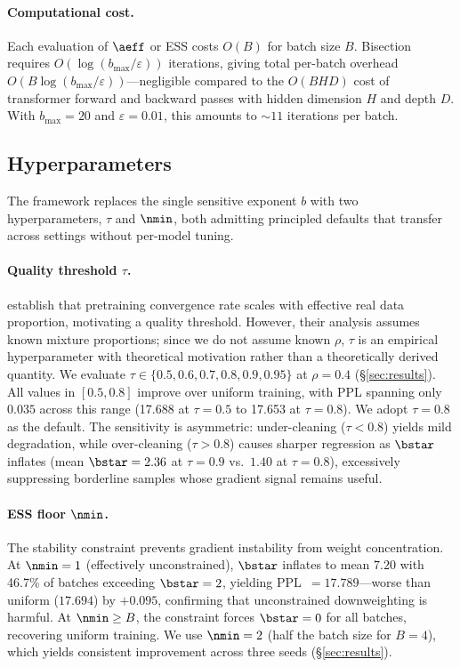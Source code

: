 \paragraph{Computational cost.}
Each evaluation of $\aeff$ or ESS costs $O(B)$ for batch size $B$.
Bisection requires $O(\log(b_{\max} / \varepsilon))$ iterations, giving total per-batch overhead $O(B \log(b_{\max} / \varepsilon))$---negligible compared to the $O(BHD)$ cost of transformer forward and backward passes with hidden dimension $H$ and depth $D$.
With $b_{\max} = 20$ and $\varepsilon = 0.01$, this amounts to ${\sim}11$ iterations per batch.

\subsection{Hyperparameters}
\label{sec:hyperparameters}

The framework replaces the single sensitive exponent $b$ with two hyperparameters, $\tau$ and $\nmin$, both admitting principled defaults that transfer across settings without per-model tuning.

\paragraph{Quality threshold $\tau$.}
\citet{wang_2026_survive_contamination} establish that pretraining convergence rate scales with effective real data proportion, motivating a quality threshold.
However, their analysis assumes known mixture proportions; since we do not assume known $\rho$, $\tau$ is an empirical hyperparameter with theoretical motivation rather than a theoretically derived quantity.
We evaluate $\tau \in \{0.5, 0.6, 0.7, 0.8, 0.9, 0.95\}$ at $\rho = 0.4$ (\S\ref{sec:results}).
All values in $[0.5, 0.8]$ improve over uniform training, with PPL spanning only $0.035$ across this range (17.688 at $\tau{=}0.5$ to 17.653 at $\tau{=}0.8$).
We adopt $\tau = 0.8$ as the default.
The sensitivity is asymmetric: under-cleaning ($\tau < 0.8$) yields mild degradation, while over-cleaning ($\tau > 0.8$) causes sharper regression as $\bstar$ inflates (mean $\bstar = 2.36$ at $\tau{=}0.9$ vs.\ $1.40$ at $\tau{=}0.8$), excessively suppressing borderline samples whose gradient signal remains useful.

\paragraph{ESS floor $\nmin$.}
The stability constraint prevents gradient instability from weight concentration.
At $\nmin = 1$ (effectively unconstrained), $\bstar$ inflates to mean $7.20$ with 46.7\% of batches exceeding $\bstar = 2$, yielding PPL~$= 17.789$---worse than uniform ($17.694$) by $+0.095$, confirming that unconstrained downweighting is harmful.
At $\nmin \geq B$, the constraint forces $\bstar = 0$ for all batches, recovering uniform training.
We use $\nmin = 2$ (half the batch size for $B = 4$), which yields consistent improvement across three seeds (\S\ref{sec:results}).

